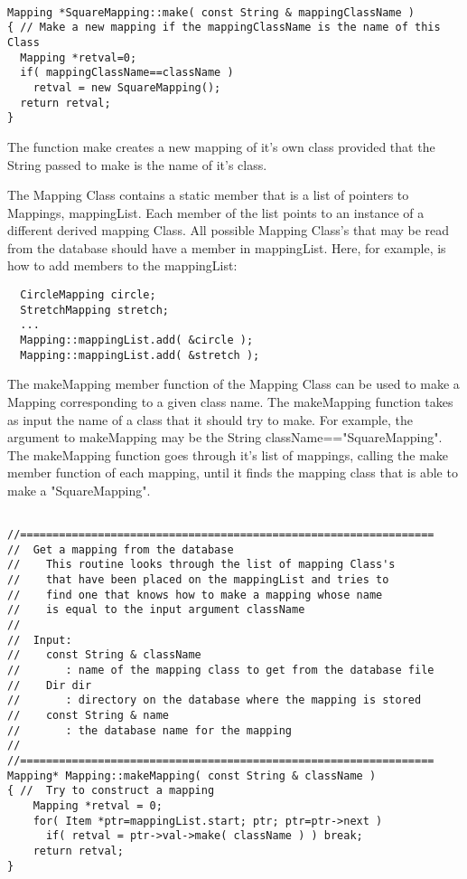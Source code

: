 \documentclass[xcolor=rgb,svgnames,dvipsnames]{article}
\begin{document}
{\footnotesize
\begin{verbatim}

Mapping *SquareMapping::make( const String & mappingClassName )
{ // Make a new mapping if the mappingClassName is the name of this Class
  Mapping *retval=0;
  if( mappingClassName==className )
    retval = new SquareMapping();
  return retval;
}
\end{verbatim}
}

The function {\ff make} creates a new mapping of it's own class provided
that the String passed to {\ff make} is the name of it's class.

The Mapping Class contains a static member that is a list of pointers
to Mappings, {\ff mappingList}. Each member of the list points
to an instance of a different derived mapping Class. All possible 
Mapping Class's that may be read from the database should have a
member in {\ff mappingList}.
Here, for example, is how to add members to the {\ff mappingList}:
{\footnotesize
\begin{verbatim}
  CircleMapping circle;
  StretchMapping stretch;
  ...
  Mapping::mappingList.add( &circle );
  Mapping::mappingList.add( &stretch );
\end{verbatim}
}

The {\ff makeMapping} member function of the Mapping Class can be used
to make a Mapping corresponding to a given class name. 
The {\ff makeMapping} function takes as input the name of a class
that it should try to make. For example, the argument to {\ff makeMapping}
may be the String {\ff className=="SquareMapping"}. The {\ff makeMapping} function
goes through it's list of mappings,
calling the {\ff make} member function of each mapping, until
it finds the mapping class that is able to make a {\ff "SquareMapping"}. 

{\footnotesize
\begin{verbatim}

//================================================================
//  Get a mapping from the database
//    This routine looks through the list of mapping Class's
//    that have been placed on the mappingList and tries to
//    find one that knows how to make a mapping whose name
//    is equal to the input argument className
// 
//  Input:
//    const String & className 
//       : name of the mapping class to get from the database file
//    Dir dir
//       : directory on the database where the mapping is stored
//    const String & name
//       : the database name for the mapping
//
//================================================================
Mapping* Mapping::makeMapping( const String & className )
{ //  Try to construct a mapping 
    Mapping *retval = 0;
    for( Item *ptr=mappingList.start; ptr; ptr=ptr->next )
      if( retval = ptr->val->make( className ) ) break;
    return retval;
}
\end{verbatim}
}
\end{document}

